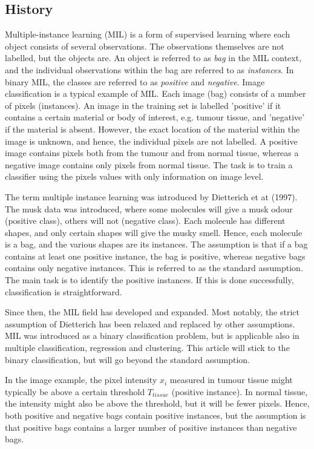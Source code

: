\subsection{History} 

Multiple-instance learning (MIL) is a form of supervised learning where each object consists of several observations.
The observations themselves are not labelled, but the objects are.  
An object is referred to as {\it bag} in the MIL context, and the individual observations within the bag are referred to as {\it instances}.
In binary MIL, the classes are referred to as {\it positive} and {\it negative}. 
Image classification is a typical example of MIL. 
Each image (bag) consists of a number of pixels (instances).
An image in the training set is labelled 'positive' if it contains a certain material or body of interest, e.g. tumour tissue, and 'negative' if the material is absent. 
However, the exact location of the material within the image is unknown, and hence, the individual pixels are not labelled. 
A positive image contains pixels both from the tumour and from normal tissue, whereas a negative image contains only pixels from normal tissue. 
The task is to train a classifier using the pixels values with only information on image level. 

The term multiple instance learning was introduced by {\color{green} Dietterich et at (1997)}. 
The musk data was introduced, where some molecules will give a musk odour (positive class), others will not (negative class). 
Each molecule has different shapes, and only certain shapes will give the musky smell. 
Hence, each molecule is a bag, and the various shapes are its instances. 
The assumption is that if a bag contains at least one positive instance, the bag is positive, whereas negative bags contains only negative instances. 
This is referred to as the standard assumption. 
The main task is to identify the positive instances. 
If this is done successfully, classification is straightforward.

Since then, the MIL field has developed and expanded. 
Most notably, the strict assumption of Dietterich has been relaxed and replaced by other assumptions. 
MIL was introduced as a binary classification problem, but is applicable also in multiple classification, regression and clustering. 
This article will stick to the binary classification, but will go beyond the standard assumption. 

In the image example, the pixel intensity $x_i$ measured in tumour tissue might typically be above a certain threshold $T_{tissue}$ (positive instance).  
In normal tissue, the intensity might also be above the threshold, but it will be fewer pixels. 
Hence, both positive and negative bags contain positive instances, but the assumption is that positive bags contains a larger number of positive instances than negative bags. 

